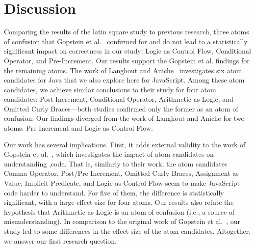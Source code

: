 \section{Discussion}
\label{sec:discussion}


Comparing the results of the latin square study to previous research, three 
atoms of confusion that Gopstein et al.~\cite{DBLP:conf/sigsoft/GopsteinIYDZYC17} confirmed
for \clang and \cpplang do not lead to a statistically significant impact
on correctness in our study: Logic as Control Flow,
Conditional Operator, and Pre-Increment. Our results
support the Gopstein et al. findings for the remaining
atoms. The work of Langhout and Aniche~\cite{Langhout:2021:ACJ} investigates six atom candidates for Java that we also explore here for JavaScript. Among these atom
candidates, we achieve similar conclusions to their
study for four atom candidates: Post Increment,
Conditional Operator, Arithmetic as Logic, and
Omitted Curly Braces---both studies confirmed only the former
as an atom of confusion. Our findings diverged from
the work of Langhout and Aniche for two atoms: Pre Increment and
Logic as Control Flow.



Our work has several implications.
First, it adds external validity to the
work of Gopstein et al.~\cite{DBLP:conf/sigsoft/GopsteinIYDZYC17},
which investigates
the impact of atom candidates on
understanding \clang,\cpplang code. That is,
similarly to their work, the atom candidates
Comma Operator, Post/Pre Increment, Omitted Curly Braces,
Assignment as Value, Implicit Predicate, and Logic as
Control Flow seem to make 
JavaScript code harder to understand. For five of them, the difference is statistically significant, with a large effect size for four atoms. Our results also 
refute the hypothesis that Arithmetic as Logic is an atom of confusion (i.e., a source of misunderstanding).
In comparison to the original
work of Gopstein et al.~\cite{DBLP:conf/sigsoft/GopsteinIYDZYC17}, 
our study
led to some differences in the effect size
of the atom candidates.
Altogether, we answer our first research question.

